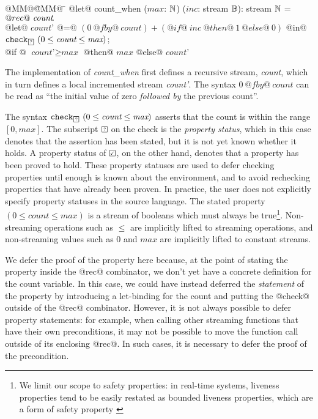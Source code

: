 \begin{tabbing}
  @MM@\= @MM@ \= \kill
  @let@ count_when ($\textit{max}$: $\mathbb{N}$) ($\textit{inc}$: stream $\mathbb{B}$): stream $\mathbb{N}$ = \\
    \> $@rec@~\textit{count}\hspace{-0.1em}.~$ \\
    \> \> @let@ $\textit{count'}$ @=@ $(0~@fby@~\textit{count}) + (@if@~\textit{inc}~@then@~1~@else@~0)$ @in@ \\
    \> \> $\xcheckP{\PSUnknown}{(0 \le \textit{count} \le \textit{max})}$; \\
    \> \> @if @ $\textit{count'} \ge \textit{max}$ @then@ $\textit{max}$  @else@ $\textit{count'}$ \\
\end{tabbing}

The implementation of \emph{count_when} first defines a recursive stream, \emph{count}, which in turn defines a local incremented stream \emph{count'}.
The syntax $0~@fby@~\textit{count}$ can be read as ``the initial value of zero \emph{followed by} the previous count''.

The syntax $\xcheckP{\PSUnknown}{(0 \le \textit{count} \le \textit{max})}$ asserts that the count is within the range $[0, \textit{max}]$.
The subscript $\PSUnknown$ on the check is the \emph{property status}, which in this case denotes that the assertion has been stated, but it is not yet known whether it holds.
A property status of $\PSValid$, on the other hand, denotes that a property has been proved to hold.
These property statuses are used to defer checking properties until enough is known about the environment, and to avoid rechecking properties that have already been proven.
In practice, the user does not explicitly specify property statuses in the source language.
The stated property $(0 \le \textit{count} \le \textit{max})$ is a stream of booleans which must always be true\footnote{We limit our scope to safety properties: in real-time systems, liveness properties tend to be easily restated as bounded liveness properties, which are a form of safety property \cite{manna2012temporal}}.
Non-streaming operations such as $\le$ are implicitly lifted to streaming operations, and non-streaming values such as $0$ and $\textit{max}$ are implicitly lifted to constant streams.

We defer the proof of the property here because, at the point of stating the property inside the @rec@ combinator, we don't yet have a concrete definition for the count variable.
In this case, we could have instead deferred the \emph{statement} of the property by introducing a let-binding for the count and putting the @check@ outside of the @rec@ combinator.
However, it is not always possible to defer property statements: for example, when calling other streaming functions that have their own preconditions, it may not be possible to move the function call outside of its enclosing @rec@.
In such cases, it is necessary to defer the proof of the precondition.




